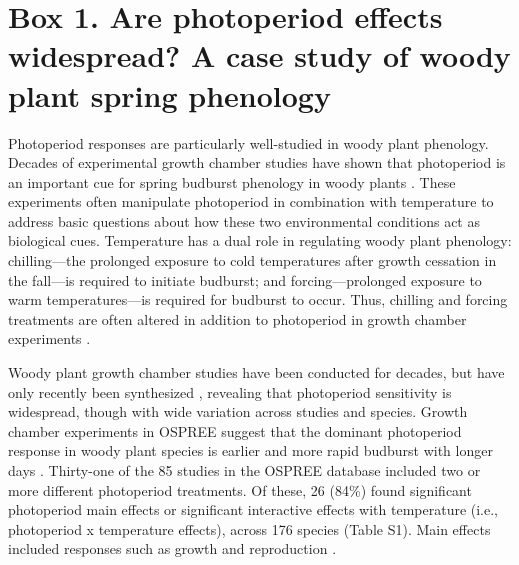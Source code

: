 \documentclass{article}
\begin{document}
\section*{Box 1. Are photoperiod effects widespread? A case study of woody plant spring phenology}
Photoperiod responses are particularly well-studied in woody plant phenology. Decades of experimental growth chamber studies have shown that photoperiod is an important cue for spring budburst phenology in woody plants \citep[e.g.,][]{Basler:2014aa,flynn2018,Heide:1993a}. These experiments often manipulate photoperiod in combination with temperature to address basic questions about how these two environmental conditions act as biological cues. Temperature has a dual role in regulating woody plant phenology: chilling---the prolonged exposure to cold temperatures after growth cessation in the fall---is required to initiate budburst; and forcing---prolonged exposure to warm temperatures---is required for budburst to occur. Thus, chilling and forcing treatments are often altered in addition to photoperiod in growth chamber experiments \citep[e.g.,][]{Campbell:1975aa,Falusi:1990aa,HEIDE:1977aa,Laube:2014a,Spann:2004aa}. %

\par Woody plant growth chamber studies have been conducted for decades, but have only recently been synthesized \citep{wolkovich2019}, revealing that photoperiod sensitivity is widespread, though with wide variation across studies and species. Growth chamber experiments in OSPREE suggest that the dominant photoperiod response in woody plant species is earlier and more rapid budburst with longer days \citep [e.g., ][]{Caffarra:2011a}. Thirty-one of the 85 studies in the OSPREE database included two or more different photoperiod treatments. Of these, 26 (84\%) found significant photoperiod main effects or significant interactive effects with temperature (i.e., photoperiod x temperature effects), across 176 species (Table S1). Main effects included responses such as growth \citep[e.g., higher growth rates with longer days][]{Ashby:1962aa} and reproduction \citep[e.g., increased flowering with longer days][]{Heide:2012aa}. 
\end{document}
